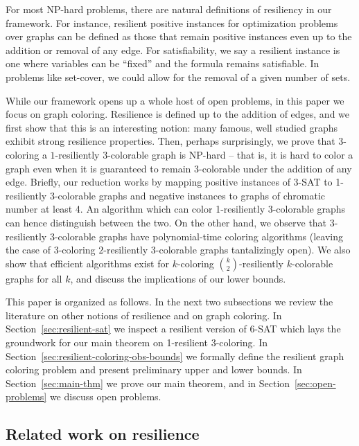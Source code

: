 \documentclass{article}[11pt]  %
\begin{document}
For most NP-hard problems, there are natural definitions of resiliency in our
framework.  For instance, resilient positive instances for optimization
problems over graphs can be defined as those that remain positive instances
even up to the addition or removal of any edge.  For satisfiability, we say a
resilient instance is one where variables can be ``fixed'' and the formula
remains satisfiable. In problems like set-cover, we could allow for the removal
of a given number of sets.

While our framework opens up a whole host of open problems, in this paper we
focus on graph coloring. Resilience is defined up to the addition of edges, and
we first show that this is an interesting notion: many famous, well studied
graphs exhibit strong resilience properties. Then, perhaps surprisingly, we
prove that $3$-coloring a $1$-resiliently 3-colorable graph is NP-hard -- that
is, it is hard to color a graph even when it is guaranteed to remain
$3$-colorable under the addition of any edge.  Briefly, our reduction works by
mapping positive instances of 3-SAT to 1-resiliently 3-colorable graphs and
negative instances to graphs of chromatic number at least 4. An algorithm which
can color 1-resiliently 3-colorable graphs can hence distinguish between the
two. On the other hand, we observe that $3$-resiliently $3$-colorable graphs
have polynomial-time coloring algorithms (leaving the case of 3-coloring
$2$-resiliently $3$-colorable graphs tantalizingly open). We also show that
efficient algorithms exist for $k$-coloring $\binom{k}{2}$-resiliently
$k$-colorable graphs for all $k$, and discuss the implications of our lower
bounds. 

This paper is organized as follows. In the next two subsections we review the
literature on other notions of resilience and on graph coloring. In
Section~\ref{sec:resilient-sat} we inspect a resilient version of 6-SAT which
lays the groundwork for our main theorem on 1-resilient 3-coloring. In
Section~\ref{sec:resilient-coloring-obs-bounds} we formally define the resilient
graph coloring problem and present preliminary upper and lower bounds. In
Section~\ref{sec:main-thm} we prove our main theorem, and in
Section~\ref{sec:open-problems} we discuss open problems.



\subsection{Related work on resilience}
\end{document}
